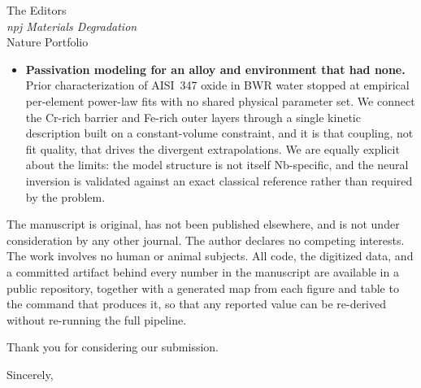 \documentclass[11pt]{letter}
\begin{document}
\begin{letter}{The Editors \\ \textit{npj Materials Degradation} \\ Nature Portfolio}
\begin{itemize}
\item \textbf{Passivation modeling for an alloy and environment that had
none.} Prior characterization of AISI~347 oxide in BWR water stopped at
empirical per-element power-law fits with no shared physical parameter
set. We connect the Cr-rich barrier and Fe-rich outer layers through a
single kinetic description built on a constant-volume constraint, and it
is that coupling, not fit quality, that drives the divergent
extrapolations. We are equally explicit about the limits: the model
structure is not itself Nb-specific, and the neural inversion is
validated against an exact classical reference rather than required by
the problem.
\end{itemize}

The manuscript is original, has not been published elsewhere, and is not
under consideration by any other journal. The author declares no
competing interests. The work involves no human or animal subjects. All
code, the digitized data, and a committed artifact behind every number
in the manuscript are available in a public repository, together with a
generated map from each figure and table to the command that produces
it, so that any reported value can be re-derived without re-running the
full pipeline.

Thank you for considering our submission.

\closing{Sincerely,}

\end{letter}
\end{document}
